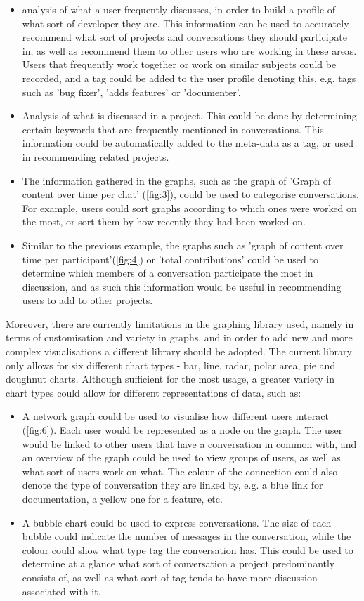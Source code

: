 \documentclass{l4proj}
\begin{document}
\begin{itemize}
\item analysis of what a user frequently discusses, in order to build a profile of what sort of developer they are.  This information can be used to accurately recommend what sort of projects and conversations they should participate in, as well as recommend them to other users who are working in these areas.  Users that frequently work together or work on similar subjects could be recorded, and a tag could be added to the user profile denoting this, e.g. tags such as 'bug fixer', 'adds features' or 'documenter'.
\item Analysis of what is discussed in a project.  This could be done by determining certain keywords that are frequently mentioned in conversations.  This information could be automatically added to the meta-data as a tag, or used in recommending related projects.
\item The information gathered in the graphs, such as the graph of 'Graph of content over time per chat' (\ref{fig:3}), could be used to categorise conversations.  For example, users could sort graphs according to which ones were worked on the most, or sort them by how recently they had been worked on.
\item Similar to the previous example, the graphs such as 'graph of content over time per participant'(\ref{fig:4}) or 'total contributions' could be used to determine which members of a conversation participate the most in discussion, and as such this information would be useful in recommending users to add to other projects.
\end{itemize}
\newpage
Moreover, there are currently limitations in the graphing library used, namely in terms of customisation and variety in graphs, and in order to add new and more complex visualisations a different library should be adopted.  The current library only allows for six different chart types - bar, line, radar, polar area, pie and doughnut charts.  Although sufficient for the most usage, a greater variety in chart types could allow for different representations of data, such as:

\begin{itemize}
\item A network graph could be used to visualise how different users interact (\ref{fig:6}).  Each user would be represented as a node on the graph.  The user would be linked to other users that have a conversation in common with, and an overview of the graph could be used to view groups of users, as well as what sort of users work on what.  The colour of the connection could also denote the type of conversation they are linked by, e.g. a blue link for documentation, a yellow one for a feature, etc.
\item A bubble chart could be used to express conversations.  The size of each bubble could indicate the number of messages in the conversation, while the colour could show what type tag the conversation has.  This could be used to determine at a glance what sort of conversation a project predominantly consists of, as well as what sort of tag tends to have more discussion associated with it.

\end{itemize}
\end{document}
